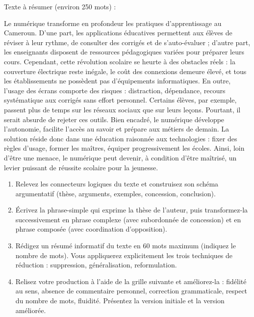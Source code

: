 \documentclass[11pt]{article}
\begin{document}
\begin{exercice}
Texte à résumer (environ 250 mots) :

\og Le numérique transforme en profondeur les pratiques d'apprentissage au Cameroun. D'une part, les applications éducatives permettent aux élèves de réviser à leur rythme, de consulter des corrigés et de s'auto-évaluer ; d'autre part, les enseignants disposent de ressources pédagogiques variées pour préparer leurs cours. Cependant, cette révolution scolaire se heurte à des obstacles réels : la couverture électrique reste inégale, le coût des connexions demeure élevé, et tous les établissements ne possèdent pas d'équipements informatiques. En outre, l'usage des écrans comporte des risques : distraction, dépendance, recours systématique aux corrigés sans effort personnel. Certains élèves, par exemple, passent plus de temps sur les réseaux sociaux que sur leurs leçons. Pourtant, il serait absurde de rejeter ces outils. Bien encadré, le numérique développe l'autonomie, facilite l'accès au savoir et prépare aux métiers de demain. La solution réside donc dans une éducation raisonnée aux technologies : fixer des règles d'usage, former les maîtres, équiper progressivement les écoles. Ainsi, loin d'être une menace, le numérique peut devenir, à condition d'être maîtrisé, un levier puissant de réussite scolaire pour la jeunesse. \fg

\begin{enumerate}
\item Relevez les connecteurs logiques du texte et construisez son schéma argumentatif (thèse, arguments, exemples, concession, conclusion).
\item Écrivez la phrase-simple qui exprime la thèse de l'auteur, puis transformez-la successivement en phrase complexe (avec subordonnée de concession) et en phrase composée (avec coordination d'opposition).
\item Rédigez un résumé informatif du texte en 60 mots maximum (indiquez le nombre de mots). Vous appliquerez explicitement les trois techniques de réduction : suppression, généralisation, reformulation.
\item Relisez votre production à l'aide de la grille suivante et améliorez-la : fidélité au sens, absence de commentaire personnel, correction grammaticale, respect du nombre de mots, fluidité. Présentez la version initiale et la version améliorée.
\end{enumerate}
\end{exercice}
\end{document}
